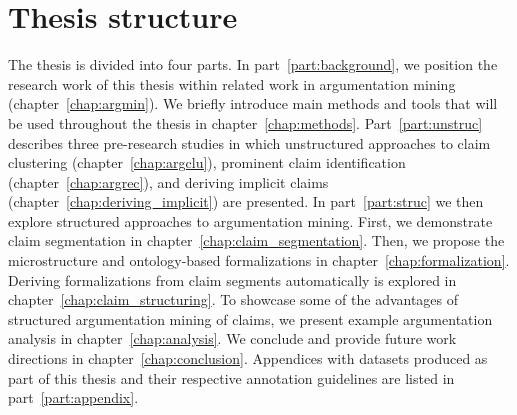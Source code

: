 \section{Thesis structure}

The thesis is divided into four parts. In part~\ref{part:background}, 
we position the research work of this thesis within related work in 
argumentation mining (chapter~\ref{chap:argmin}). We briefly introduce
main methods and tools that will be used throughout the thesis in 
chapter~\ref{chap:methods}. Part~\ref{part:unstruc} describes three 
pre-research studies in which unstructured approaches to 
claim clustering (chapter~\ref{chap:argclu}), 
prominent claim identification (chapter~\ref{chap:argrec}), and 
deriving implicit claims (chapter~\ref{chap:deriving_implicit}) are presented. 
In part~\ref{part:struc} we then explore structured approaches to argumentation mining. 
First, we demonstrate claim segmentation in chapter~\ref{chap:claim_segmentation}.
Then, we propose the microstructure and ontology-based formalizations 
in chapter~\ref{chap:formalization}. Deriving formalizations from 
claim segments automatically is explored in chapter~\ref{chap:claim_structuring}.
To showcase some of the advantages of structured argumentation mining of claims,
we present example argumentation analysis in chapter~\ref{chap:analysis}.
We conclude and provide future work directions in chapter~\ref{chap:conclusion}.
Appendices with datasets produced as part of this thesis 
and their respective annotation
guidelines are listed in part~\ref{part:appendix}. 

